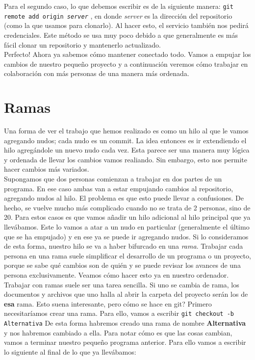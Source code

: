 \documentclass[10pt,letterpaper]{article}
\newcommand{\inlinecode}[1]{
\colorbox{light-gray}{\texttt{#1}}
}
\begin{document}
Para el segundo caso, lo que debemos escribir es de la siguiente manera: \inlinecode{git remote add origin \emph{server}}, en donde \emph{server} es la direcci\'on del repositorio (como la que usamos para clonarlo). Al hacer esto, el servicio tambi\'en nos pedir\'a credenciales. Este m\'etodo se usa muy poco debido a que generalmente es m\'as f\'acil clonar un repositorio y mantenerlo actualizado.\\

Perfecto! Ahora ya sabemos c\'omo mantener conectado todo. Vamos a empujar los cambios de nuestro peque\~no proyecto y a continuaci\'on veremos c\'omo trabajar en colaboraci\'on con m\'as personas de una manera m\'as ordenada.

\section{Ramas}
Una forma de ver el trabajo que hemos realizado es como un hilo al que le vamos agregando nudos; cada nudo es un commit. La idea entonces es ir extendiendo el hilo agreg\'andole un nuevo nudo cada vez. Esta parece ser una manera muy l\'ogica y ordenada de llevar los cambios vamos realiando. Sin embargo, esto nos permite hacer cambios m\'as variados.\\

Supongamos que dos personas comienzan a trabajar en dos partes de un programa. En ese caso ambas van a estar empujando cambios al repositorio, agregando nudos al hilo. El problema es que esto puede llevar a confusiones. De hecho, se vuelve mucho m\'as complicado cuando no se trata de 2 personas, sino de 20. Para estos casos es que vamos a\~nadir un hilo adicional al hilo principal que ya llev\'abamos. Este lo vamos a atar a un nudo en particular (generalmente el \'ultimo que se ha empujado) y en ese ya se puede ir agregando nudos. Si lo consideramos de esta forma, nuestro hilo se va a haber bifurcado en una \emph{rama}. Trabajar cada persona en una rama suele simplificar el desarrollo de un programa o un proyecto, porque se sabe qu\'e cambios son de qui\'en y se puede revisar los avances de una persona exclusivamente. Veamos c\'omo hacer esto ya en nuestro ordenador.\\

Trabajar con ramas suele ser una tarea sencilla. Si uno se cambia de rama, los documentos y archivos que uno halla al abrir la carpeta del proyecto ser\'an los de \textbf{esa} rama. Esto suena interesante, pero c\'omo se hace en git? Primero necesitar\'iamos crear una rama. Para ello, vamos a escribir \inlinecode{git checkout -b Alternativa} De esta forma habremos creado una rama de nombre \textbf{Alternativa} y nos habremos cambiado a ella. Para notar c\'omo es que las cosas cambian, vamos a terminar nuestro peque\~no programa anterior. Para ello vamos a escribir lo siguiente al final de lo que ya llev\'abamos:
\end{document}
